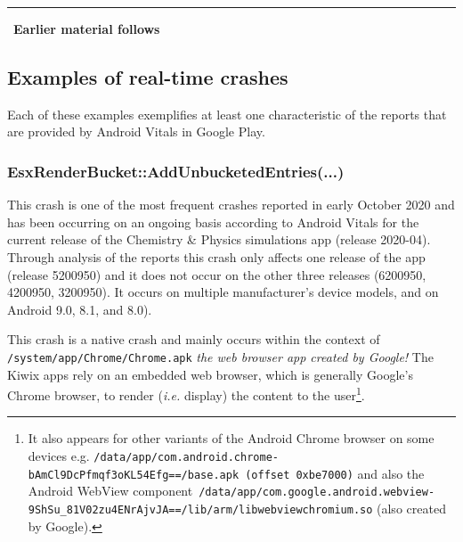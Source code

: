 \par\noindent\rule{\textwidth}{0.4pt}
~\textbf{Earlier material follows}









\subsection{Examples of real-time crashes}
Each of these examples exemplifies at least one characteristic of the reports that are provided by Android Vitals in Google Play.

\subsubsection{EsxRenderBucket::AddUnbucketedEntries(...)}
This crash is one of the most frequent crashes reported in early October 2020 and has been occurring on an ongoing basis according to Android Vitals for the current release of the Chemistry \& Physics simulations app (release 2020-04). Through analysis of the reports this crash only affects one release of the app (release 5200950) and it does not occur on the other three releases (6200950, 4200950, 3200950). It occurs on multiple manufacturer's device models, and on Android 9.0, 8.1, and 8.0). 

This crash is a native crash and mainly occurs within the context of \texttt{/system/app/Chrome/Chrome.apk} \textit{the web browser app created by Google!} The Kiwix apps rely on an embedded web browser, which is generally Google's Chrome browser, to render (\emph{i.e.} display) the content to the user\footnote{It also appears for other variants of the Android Chrome browser on some devices e.g. \texttt{/data/app/com.android.chrome-bAmCl9DcPfmqf3oKL54Efg==/base.apk (offset 0xbe7000)} and also the Android WebView component~\texttt{/data/app/com.google.android.webview-9ShSu\_81V02zu4ENrAjvJA==/lib/arm/libwebviewchromium.so} (also created by Google).}.

